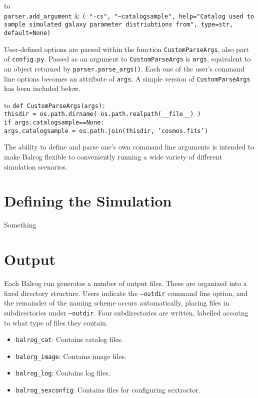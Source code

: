 \documentclass[12pt]{article}
\newcommand{\balrog}{Balrog}
\newcommand{\opt}[1]{\texttt{--#1}}
\begin{document}
\setlength{\tabcolsep}{0pt}
\begin{longtabu} to \linewidth {l X}
\\
\hspace{20pt} \texttt{parser.add\_argument} & \texttt{( "-cs", "--catalogsample", help="Catalog used to
sample simulated galaxy parameter distriubtions from", type=str, default=None)}
\end{longtabu}
\setlength{\tabcolsep}{6pt}


User-defined options are parsed within the function \texttt{CustomParseArgs},
also part of \texttt{config.py}.
Passed as an argument to \texttt{CustomParseArgs} is \texttt{args}, equivalent
to an object returned by \texttt{parser.parse\_args()}. Each one of the user's 
command line options becomes an attribute of \texttt{args}. 
A simple version of \texttt{CustomParseArgs} has been included below.

\setlength{\tabcolsep}{0pt}
\begin{longtabu} to \linewidth {X}
\texttt{def CustomParseArgs(args):}\\
\hspace{20pt} \texttt{thisdir = os.path.dirname( os.path.realpath(\_\_file\_\_) )} \\
\hspace{20pt} \texttt{if args.catalogsample==None:} \\
\hspace{40pt} \texttt{args.catalogsample = os.path.join(thisdir, 'cosmos.fits')}
\end{longtabu}
\setlength{\tabcolsep}{6pt}

\noindent The ability to define and parse one's own command line arguments is intended to make
\balrog{} flexible to conveniently running a wide variety of different
simulation scenarios. 

\section{Defining the Simulation}
\label{sec:simrules}

Something

\section{Output}
Each \balrog{} run generates a number of output files. 
These are organized into a fixed directory structure.
Users indicate the \opt{outdir} command line option, and
the remainder of the naming scheme occurs automatically,
placing files in subdirectories under \opt{outdir}.
Four subdirectories are written, labelled accoring to what
type of files they contain. 

\begin{itemize}
	\item \texttt{balrog\_cat}: Contains catalog files.
	\item \texttt{balorg\_image}: Contains image files.
	\item \texttt{balrog\_log}: Contains log files.
	\item \texttt{balrog\_sexconfig}: Contains files for configuring sextractor.
\end{itemize}
\end{document}
